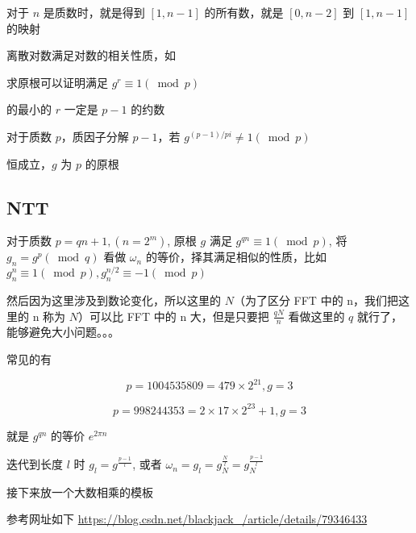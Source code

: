 对于 $n$ 是质数时，就是得到 $[1,n−1]$ 的所有数，就是 $[0,n−2]$ 到 $[1,n−1]$ 的映射

离散对数满足对数的相关性质，如

求原根可以证明满足 $g^r \equiv 1(\bmod p)$

​的最小的 $r$ 一定是 $p−1$ 的约数

对于质数 $p$，质因子分解 $p−1$，若 $g^{(p-1)/pi} \neq 1 (\bmod p)$

​恒成立，$g$ 为 $p$ 的原根

\subsection{NTT}

对于质数 $p=qn+1, (n=2^m)$ ​, 原根 $g$ 满足 $g^{qn} \equiv 1 (\bmod p)$​, 将 $g_n=g^p(\bmod q)$ 看做 $\omega_n$ 的等价，择其满足相似的性质，比如 $g_n^n \equiv 1 (\bmod p), g_n^{n/2} \equiv -1 (\bmod p)$

然后因为这里涉及到数论变化，所以这里的 $N$（为了区分 FFT 中的 n，我们把这里的 n 称为 $N$）可以比 FFT 中的 n 大，但是只要把 $\frac{qN}{n}$ 看做这里的 $q$ 就行了，能够避免大小问题。。。

常见的有

$$
p = 1004535809 = 479 \times 2^{21}, g=3
$$

$$
p=998244353=2 \times 17 \times 2^{23}+1, g=3
$$

就是 $g^{qn}$ 的等价 $e^{2\pi n}$

迭代到长度 $l$ 时 $g_l = g^{\frac{p-1}{l}}$, 或者 $\omega_n = g_l = g_N^{\frac{N}{l}} = g_N^{\frac{p-1}{l}}$

接下来放一个大数相乘的模板

参考网址如下 \url{https://blog.csdn.net/blackjack_/article/details/79346433}

